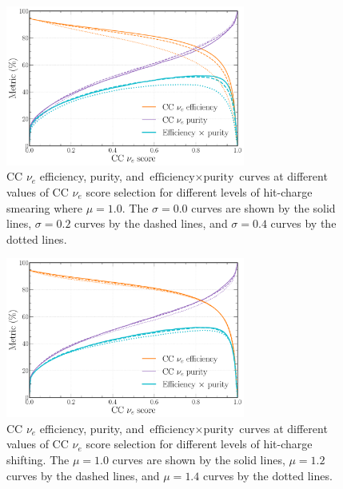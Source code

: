 \begin{figure} %
    \includegraphics[width=0.7\textwidth]{diagrams/7-results/calib_charge_rand_nuel_eff_curves.pdf}
    \caption[CC $\nu_{e}$ efficiency and purity curves for different levels of hit-charge smearing]
    {CC $\nu_{e}$ efficiency, purity, and $\text{efficiency}\times\text{purity}$ curves at
        different values of CC $\nu_{e}$ score selection for different levels of hit-charge
        smearing where $\mu=1.0$. The $\sigma=0.0$ curves are shown by the solid lines,
        $\sigma=0.2$ curves by the dashed lines, and $\sigma=0.4$ curves by the dotted lines.}
    \label{fig:calib_charge_rand_nuel_eff_curves}
\end{figure}

\begin{figure} %
    \includegraphics[width=0.7\textwidth]{diagrams/7-results/calib_charge_shift_nuel_eff_curves.pdf}
    \caption[CC $\nu_{e}$ efficiency and purity curves for different levels of hit-charge shifting]
    {CC $\nu_{e}$ efficiency, purity, and $\text{efficiency}\times\text{purity}$ curves at
        different values of CC $\nu_{e}$ score selection for different levels of hit-charge
        shifting. The $\mu=1.0$ curves are shown by the solid lines, $\mu=1.2$ curves by the
        dashed lines, and $\mu=1.4$ curves by the dotted lines.}
    \label{fig:calib_charge_shift_nuel_eff_curves}
\end{figure}

